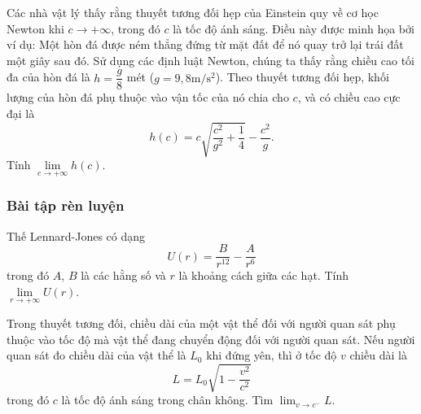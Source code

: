 \begin{vd}%
Các nhà vật lý  thấy rằng thuyết tương đối hẹp của Einstein quy về cơ học Newton khi $c \rightarrow +\infty$, trong đó $c$ là tốc độ ánh sáng. Điều này được minh họa bởi ví dụ: Một hòn đá được ném thẳng đứng từ mặt đất để nó quay trở lại trái đất một giây sau đó. Sử dụng các định luật Newton, chúng ta thấy rằng chiều cao tối đa của hòn đá là $h=\dfrac{g}{8}$ mét ($g = 9{,}8 \mathrm{m/ s ^2}$). Theo thuyết tương đối hẹp, khối lượng của hòn đá phụ thuộc vào vận tốc của nó chia cho $c$, và có chiều cao cực đại là 
\[
h(c)=c \sqrt{\dfrac{c^2}{g^2}+\dfrac{1}{4}}- \dfrac{c^2}{g}.
\]
Tính $\lim\limits _{c \rightarrow +\infty} h(c)$.
\end{vd}



\subsubsection{Bài tập rèn luyện}
\begin{bt}%
Thế Lennard-Jones có dạng $$U(r) = \dfrac{B}{r^{12}} - \dfrac{A}{r^6}$$ trong đó $A$, $B$ là các hằng số và $r$ là khoảng cách giữa các hạt. 
Tính $\lim\limits _{r \rightarrow +\infty} U(r)$.
\end{bt}

\begin{bt}%
Trong thuyết tương đối, chiều dài của một vật thể đối với người quan sát phụ thuộc vào tốc độ mà vật thể đang chuyển động đối với người quan sát. Nếu người quan sát đo chiều dài của vật thể là $L_0$ khi đứng yên, thì ở tốc độ $v$ chiều dài  là
$$
L=L_0 \sqrt{1-\frac{v^2}{c^2}}
$$
trong đó $c$ là tốc độ ánh sáng trong chân không. Tìm $\displaystyle \lim _{v \rightarrow c^{-}} L$. 
\end{bt}

